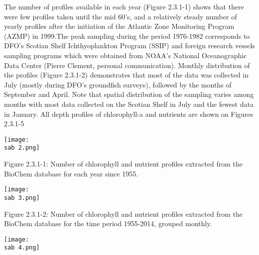 \documentclass[letterpaper,portrait,12pt]{scrartcl}
\numberwithin{equation}{section}		%
\numberwithin{figure}{section}			%
\numberwithin{table}{section}				%
\newcommand{\sab}{\string~/ecomod_data/mpa/sab/}   %
\begin{document}
The number of profiles available in each year (Figure 2.3.1-1) shows that there were few profiles taken until the mid 60's, and a relatively steady number of yearly profiles after the initiation of the Atlantic Zone Monitoring Program (AZMP) in 1999.The peak sampling during the period 1976-1982 corresponds to DFO's Scotian Shelf Ichthyoplankton Program (SSIP) and foreign research vessels sampling programs which were obtained from NOAA's National Oceanographic Data Center (Pierre Clement, personal communication).  Monthly distribution of the profiles (Figure 2.3.1-2)  demonstrates that most of the data was collected in July (mostly during DFO's groundfish surveys), followed by the months of September and April. Note that spatial distribution of the sampling varies among months with most data collected on the Scotian Shelf in July and the fewest data in January. All depth profiles of chlorophyll-a and nutrients are shown on Figures 2.3.1-5














\texttt{[image: \\sab 2.png]}





Figure 2.3.1-1: Number of chlorophyll and nutrient profiles extracted from the BioChem database for each year since 1955. 














\texttt{[image: \\sab 3.png]}





Figure 2.3.1-2: Number of chlorophyll and nutrient profiles extracted from the BioChem database for the time period 1955-2014, grouped monthly. 



















\texttt{[image: \\sab 4.png]}
\end{document}
